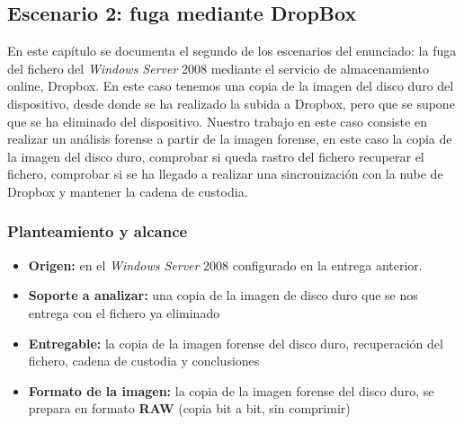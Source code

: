%
%
%

\subsection{Escenario 2: fuga mediante DropBox}
\label{cap:dropbox}

En este capítulo se documenta el segundo de los escenarios del enunciado: la fuga del fichero  del \textit{Windows Server} 2008 mediante el servicio de almacenamiento online, Dropbox. En este caso tenemos una copia de la imagen del disco duro del dispositivo, desde donde se ha realizado la subida a Dropbox, pero que se supone que se ha eliminado del dispositivo. Nuestro trabajo en este caso consiste en realizar un análisis forense a partir de la imagen forense, en este caso la copia de la imagen del disco duro, comprobar si queda rastro del fichero recuperar el fichero, comprobar si se ha llegado a realizar una sincronización con la nube de Dropbox y mantener la cadena de custodia. 

\subsubsection{Planteamiento y alcance}
\begin{itemize}
	\item \textbf{Origen:}  en el \textit{Windows Server}
	2008 configurado en la entrega anterior.
	\item \textbf{Soporte a analizar:} una copia de la imagen de disco duro que se nos entrega con el fichero ya eliminado
	\item \textbf{Entregable:} la copia de la imagen forense del disco duro, recuperación del fichero, cadena de custodia y conclusiones
	\item \textbf{Formato de la imagen:} la copia de la imagen forense del disco duro, se prepara en formato \textbf{RAW} (copia bit a bit, sin comprimir)
\end{itemize}

